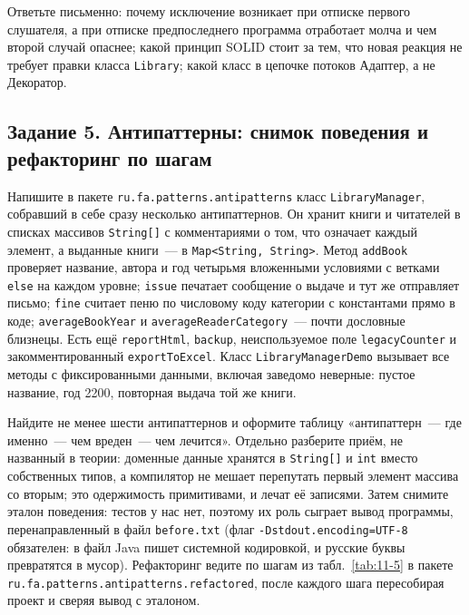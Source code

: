 Ответьте письменно: почему исключение возникает при отписке первого слушателя, а
при отписке предпоследнего программа отработает молча и чем второй случай
опаснее; какой принцип SOLID стоит за тем, что новая реакция не требует правки
класса \texttt{Library}; какой класс в цепочке потоков Адаптер, а не Декоратор.

\subsection*{Задание 5. Антипаттерны: снимок поведения и рефакторинг по шагам}

Напишите в пакете \texttt{ru.fa.patterns.antipatterns} класс
\texttt{LibraryManager}, собравший в себе сразу несколько антипаттернов. Он
хранит книги и читателей в списках массивов \texttt{String[]} с комментариями о
том, что означает каждый элемент, а выданные книги~--- в
\texttt{Map<String, String>}. Метод \texttt{addBook} проверяет название, автора
и год четырьмя вложенными условиями с ветками \texttt{else} на каждом уровне;
\texttt{issue} печатает сообщение о выдаче и тут же отправляет письмо;
\texttt{fine} считает пеню по числовому коду категории с константами прямо в
коде; \texttt{averageBookYear} и \texttt{averageReaderCategory}~--- почти
дословные близнецы. Есть ещё \texttt{reportHtml}, \texttt{backup},
неиспользуемое поле \texttt{legacyCounter} и закомментированный
\texttt{exportToExcel}. Класс \texttt{LibraryManagerDemo} вызывает все методы с
фиксированными данными, включая заведомо неверные: пустое название, год 2200,
повторная выдача той же книги.

Найдите не менее шести антипаттернов и оформите таблицу «антипаттерн~--- где
именно~--- чем вреден~--- чем лечится». Отдельно разберите приём, не названный в
теории: доменные данные хранятся в \texttt{String[]} и \texttt{int} вместо
собственных типов, а компилятор не мешает перепутать первый элемент массива со
вторым; это одержимость примитивами, и лечат её записями. Затем снимите эталон
поведения: тестов у нас нет, поэтому их роль сыграет вывод программы,
перенаправленный в файл \texttt{before.txt} (флаг
\texttt{-Dstdout.encoding=UTF-8} обязателен: в файл Java пишет системной
кодировкой, и русские буквы превратятся в мусор). Рефакторинг ведите по шагам из
табл.~\ref{tab:11-5} в пакете \texttt{ru.fa.patterns.antipatterns.refactored},
после каждого шага пересобирая проект и сверяя вывод с эталоном.

